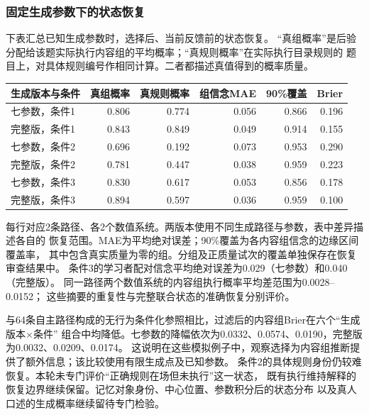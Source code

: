 \documentclass[11pt,a4paper]{article}
\numberwithin{equation}{section}
\begin{document}
\subsubsection{固定生成参数下的状态恢复}
下表汇总已知生成参数时，选择后、当前反馈前的状态恢复。
“真组概率”是后验分配给该题实际执行内容组的平均概率；“真规则概率”在实际执行目录规则的
题目上，对具体规则编号作相同计算。二者都描述真值得到的概率质量。
\begin{center}
\begin{tabularx}{\textwidth}{Y r r r r r}
\toprule
生成版本与条件 & 真组概率 & 真规则概率 & 组信念MAE & 90\%覆盖 & Brier\\
\midrule
七参数，条件1 & 0.806 & 0.774 & 0.056 & 0.866 & 0.196\\
完整版，条件1 & 0.843 & 0.849 & 0.049 & 0.914 & 0.155\\
七参数，条件2 & 0.696 & 0.192 & 0.073 & 0.953 & 0.290\\
完整版，条件2 & 0.781 & 0.447 & 0.038 & 0.959 & 0.223\\
七参数，条件3 & 0.830 & 0.617 & 0.053 & 0.856 & 0.178\\
完整版，条件3 & 0.894 & 0.597 & 0.036 & 0.959 & 0.100\\
\bottomrule
\end{tabularx}
\end{center}
每行对应2条路径、各2个数值系统。两版本使用不同生成路径与参数，表中差异描述各自的
恢复范围。MAE为平均绝对误差；90\%覆盖为各内容组信念的边缘区间覆盖率，
其中包含真实质量为零的组。分组及正质量试次的覆盖单独保存在恢复审查结果中。
条件3的学习者配对信念平均绝对误差为0.029（七参数）和0.040（完整版）。
同一路径两个数值系统的内容组执行概率平均差范围为0.0028--0.0152；
这些摘要的重复性与完整联合状态的准确恢复分别评价。

与64条自主路径构成的无行为条件化参照相比，过滤后的内容组Brier在六个“生成版本\(\times\)条件”
组合中均降低。七参数的降幅依次为0.0332、0.0574、0.0190，完整版为0.0032、0.0209、0.0174。
这说明在这些模拟例子中，观察选择为内容组推断提供了额外信息；该比较使用有限生成点及已知参数。
条件2的具体规则身份仍较难恢复。本轮未专门评价“正确规则在场但未执行”这一状态，
既有执行维持解释的恢复边界继续保留。记忆对象身份、中心位置、参数积分后的状态分布
以及真人口述的生成概率继续留待专门检验。
\end{document}
